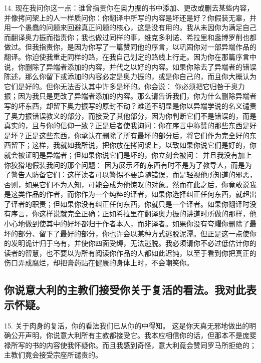 14. 现在我问你这一点：谁曾指责你在奥力振的书中添加、更改或删去某些内容，并像拷问架上的人一样质问你：你翻译中所写的内容是坏还是好？你假装无辜，并用一个愚蠢的问题来回避真正问题的核心，这是没有用的。我从未因你为满足自己而翻译奥力振而指责你；我也做过同样的事，维克多利诺、希拉里和盎博罗削也都做过。但我指责你，是因为你写了一篇赞同他的序言，以巩固你对一部异端作品的翻译。你迫使我重走同样的路，在我自己划定的路线上行走。因为你在那篇序言中说，你删除了异端者添加的内容，并代之以好的内容。如果你除去了异端者的错误陈述，那么你留下或添加的内容必定是奥力振的，或是你自己的，而且你大概认为它们是好的。但你无法否认其中许多是坏的。你会说： 你必须把它归咎于奥力振；因为我只是更改了异端者添加的内容。那么请告诉我们，你为什么删除异端者写的坏东西，却留下奥力振写的原封不动？难道不明显是你以异端学说的名义谴责了奥力振错误教义的部分，而接受了其他部分，因为你判断它们不是错误的，而是真实的，且与你的信仰一致？正是后者使我询问：你在序言中称赞的那些东西是好是坏？正是这些东西，你承认在删除了所有最坏的部分后，将它们作为完全好的东西留下；这样，我就如我所说，把你放在拷问架上，以致如果你说它们是好的，你就会被证明是异端者；但如果你说它们是坏的，你立刻会被问： 并且我没有加上你狡猾地假装我问的那个问题： 因为展示坏的东西有时不是为了教导人，而是为了警告人防备它们：这样读者可以警惕不要追随错误，而是轻视他所知道的邪恶，否则，如果它们不为人知，可能会成为他惊叹的对象。然而在此之后，你竟敢说我是这类作品的作者，而你作为一个纯粹的译者，如果你选择纠正任何东西，就超出了译者的职责；但如果你没有纠正任何东西，你就只是一个译者。如果你翻译时没有序言，你这样说就完全正确；正如希拉里在翻译奥力振的讲道时所做的那样，他小心地做到使其中的好坏都归于作者本人，而非译者。如果你没有夸耀你删除了最坏的部分、留下了最好的部分，你也许会以某种方式逃脱泥潭。但正是这一点使你的发明诡计归于乌有，并使你四面受缚，无法逃脱。我必须请你不必过低估计你的读者的智慧，也不要以为所有阅读你作品的人都如此迟钝，以至于看到你把真正的伤口弄成腐烂，却把膏药贴在健康的身体上时，不会嘲笑你。\par


\subsection{你说意大利的主教们接受你关于复活的看法。我对此表示怀疑。}

15. 关于肉身的复活，你的看法我们已从你的中得知。 这是你天真无邪地做出的明确公开声明，你说意大利所有主教都接受它。我本应相信你的话，但那本不是庞斐禄所写的书的内容使我怀疑你。而且我感到奇怪，意大利竟会赞同罗马所拒绝的；主教们竟会接受宗座所谴责的。\par

